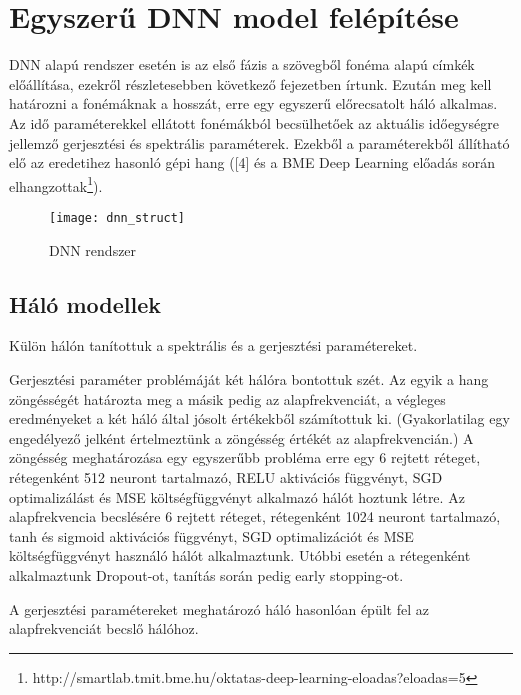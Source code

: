 \section{Egyszerű DNN model felépítése}

DNN alapú rendszer esetén is az első fázis a szövegből fonéma alapú címkék előállítása, ezekről részletesebben következő fejezetben írtunk. Ezután meg kell határozni a fonémáknak a hosszát, erre egy egyszerű előrecsatolt háló alkalmas. Az idő paraméterekkel ellátott fonémákból becsülhetőek az aktuális időegységre jellemző gerjesztési és spektrális paraméterek. Ezekből a paraméterekből állítható elő az eredetihez hasonló gépi hang ([4] és a BME Deep Learning előadás során elhangzottak\footnote{http://smartlab.tmit.bme.hu/oktatas-deep-learning-eloadas?eloadas=5}).

\begin{figure}[h]
	\texttt{[image: dnn\_struct]}
	\caption{DNN rendszer}\par\medskip\centering
\end{figure}

\subsection{Háló modellek}
Külön hálón tanítottuk a spektrális és a gerjesztési paramétereket. 

Gerjesztési paraméter problémáját két hálóra bontottuk szét. Az egyik a hang zöngésségét határozta meg a másik pedig az alapfrekvenciát, a végleges eredményeket a két háló által jósolt értékekből számítottuk ki. (Gyakorlatilag egy engedélyező jelként értelmeztünk a zöngésség értékét az alapfrekvencián.) A zöngésség meghatározása egy egyszerűbb probléma erre  egy 6 rejtett réteget, rétegenként 512 neuront tartalmazó, RELU aktivációs függvényt, SGD optimalizálást és MSE költségfüggvényt alkalmazó hálót hoztunk létre. Az alapfrekvencia becslésére 6 rejtett réteget, rétegenként 1024 neuront tartalmazó, tanh és sigmoid aktivációs függvényt, SGD optimalizációt és MSE költségfüggvényt használó hálót alkalmaztunk. Utóbbi esetén a rétegenként alkalmaztunk Dropout-ot, tanítás során pedig early stopping-ot.

A gerjesztési paramétereket meghatározó háló hasonlóan épült fel az alapfrekvenciát becslő hálóhoz.

